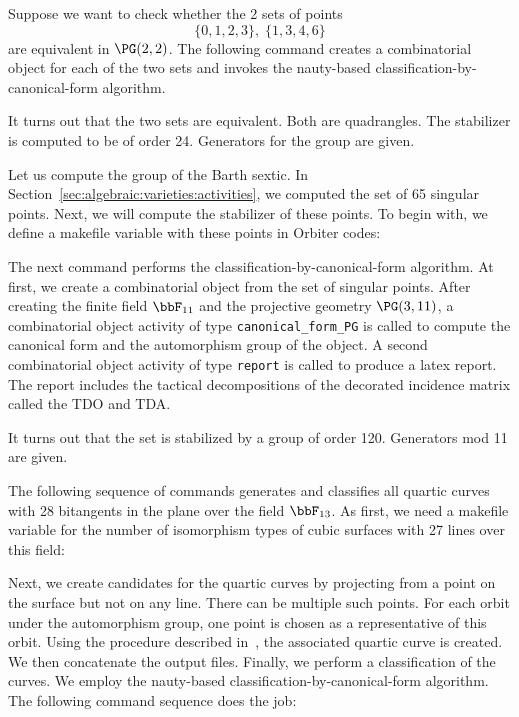 
Suppose we want to check whether the 2 sets of points 
$$
\{0,1,2,3\}, \; \{1,3,4,6\}
$$
are equivalent in $\PG(2,2)$. 
The following command creates a combinatorial object for each of the two sets 
and invokes the nauty-based classification-by-canonical-form algorithm. 



It turns out that the two sets are equivalent. 
Both are quadrangles. 
The stabilizer is computed to be of order 24. 
Generators for the group are given.






\bigskip

Let us compute the group of the Barth sextic. 
In Section~\ref{sec:algebraic:varieties:activities}, 
we computed the set of 65 singular points. 
Next, we will compute the stabilizer of these points. 
To begin with, 
we define a makefile variable with these points in Orbiter codes:


The next command performs the 
classification-by-canonical-form algorithm. 
At first, we create a combinatorial object from the set of singular points.
After creating the finite field $\bbF_{11}$ and the projective geometry $\PG(3,11)$, 
a combinatorial object activity of type \verb'canonical_form_PG' 
is called to compute the canonical form and the automorphism group of the object. 
A second combinatorial object activity of type \verb'report' 
is called to produce a latex report.
The report includes the tactical decompositions 
of the decorated incidence matrix called the TDO and TDA. 



It turns out that the set is stabilized by a group of order 120. 
Generators mod 11 are given.


\bigskip


The following sequence of commands generates 
and classifies all quartic curves with 28 bitangents 
in the plane over the field $\bbF_{13}$.
As first, we need a makefile variable for the number 
of isomorphism types of cubic surfaces with 27 lines over this field:


Next, we create candidates for the quartic curves 
by projecting from a point on the surface but not on any line. 
There can be multiple such points. 
For each orbit under the automorphism group, 
one point is chosen as a representative of this orbit. 
Using the procedure described in~\cite{Hirschfeld10}, 
the associated quartic curve is created.
We then concatenate the output files.
Finally, we perform a classification of the curves.
We employ the nauty-based 
classification-by-canonical-form algorithm.
The following command sequence 
does the job:


